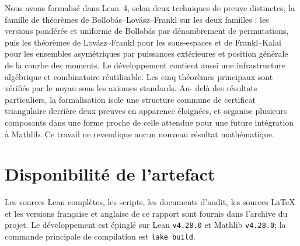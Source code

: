 \documentclass[11pt]{article}
\begin{document}
Nous avons formalisé dans Lean~4, selon deux techniques de preuve distinctes, la famille
de théorèmes de Bollobás--Lovász--Frankl sur les deux familles : les versions pondérée
et uniforme de Bollobás par dénombrement de permutations, puis les théorèmes de
Lovász--Frankl pour les sous-espaces et de Frankl--Kalai pour les ensembles asymétriques
par puissances extérieures et position générale de la courbe des moments. Le
développement contient aussi une infrastructure algébrique et combinatoire réutilisable.
Les cinq théorèmes principaux sont vérifiés par le noyau sous les axiomes standards. Au-
delà des résultats particuliers, la formalisation isole une structure commune de
certificat triangulaire derrière deux preuves en apparence éloignées, et organise
plusieurs composants dans une forme proche de celle attendue pour une future intégration
à Mathlib. Ce travail ne revendique aucun nouveau résultat mathématique.

\section*{Disponibilité de l'artefact}
Les sources Lean complètes, les scripts, les documents d'audit, les sources LaTeX et les
versions française et anglaise de ce rapport sont fournis dans l'archive du projet. Le
développement est épinglé sur Lean \texttt{v4.28.0} et Mathlib
\texttt{v4.28.0}; la commande principale de compilation est
\lstinline{lake build}.



\end{document}
